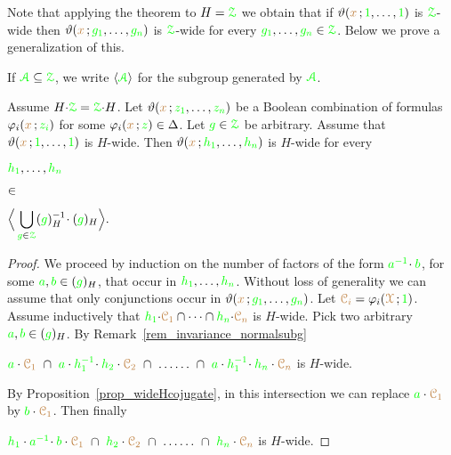 Note that applying the theorem to  $H={\color{green}\EuScript Z}$ we obtain that if $\vartheta({\color{brown} x}\,;{\color{green} 1},\dots,{\color{green} 1})$ is ${\color{green}\EuScript Z}$-wide then $\vartheta({\color{brown} x}\,;{\color{green} g_1},\dots,{\color{green} g_n})$ is ${\color{green}\EuScript Z}$-wide for every ${\color{green} g_1},\dots,{\color{green} g_n}\in{\color{green}\EuScript Z}$.
Below we prove a generalization of this. 

If ${\color{green}\EuScript A}\subseteq{\color{green}\EuScript Z}$, we write \emph{$\langle{\color{green}\EuScript A}\rangle$} for the subgroup generated by ${\color{green}\EuScript A}$.

\begin{proposition}\label{prop_stabilizer1}
  \def\medrel#1{\parbox[t]{5ex}{$\displaystyle\hfil #1$}}
  \def\ceq#1#2#3{\parbox[t]{15ex}{$\displaystyle #1$}\medrel{#2}{$\displaystyle #3$}}
  Assume $H{\cdot}{\color{green}\EuScript Z}={\color{green}\EuScript Z}{\cdot}H$.
   Let $\vartheta({\color{brown} x}\,;{\color{green} z_1},\dots,{\color{green} z_n})$ be a Boolean combination of formulas $\varphi_i({\color{brown} x}\,;{\color{green} z_i})$ for some $\varphi_i({\color{brown} x}\,;{\color{green} z})\in\Delta$.
  Let ${\color{green} g}\in{\color{green}\EuScript Z}$ be arbitrary.
  Assume that $\vartheta({\color{brown} x}\,;{\color{green} 1},\dots,{\color{green} 1})$ is $H$-wide.
  Then $\vartheta({\color{brown} x}\,;{\color{green} h_1},\dots,{\color{green} h_n})$ is $H$-wide for every 
  
  \ceq{\hfill{\gr h_1},\dots,{\gr h_n}}{\in}{\Big\<\bigcup_{{\gr g}\in\grZ}({\gr g})_H^{-1}\!\cdot({\gr g})_H\Big\>.}
\end{proposition}

\begin{proof}
  We proceed by induction on the number of factors of the form ${\color{green} a^{-1}}\!\cdot{\color{green}b}$, for some ${\color{green} a},{\color{green} b}\in({\color{green} g})_H$, that occur in ${\color{green} h_1},\dots,{\color{green} h_n}$.
  Without loss of generality we can assume that only conjunctions occur in $\vartheta({\color{brown} x}\,;{\color{green} g_1},\dots,{\color{green} g_n})$.
  Let ${\color{brown}\EuScript C_i}=\varphi_i({\color{brown}\EuScript X}\,;{\color{green} 1})$.
  Assume inductively that ${\color{green} h_1}{\cdot}{\color{brown}\EuScript C_1}\cap\dots\cap{\color{green}h_n}{\cdot}{\color{brown}\EuScript C_n}$ is $H$-wide.
  Pick two arbitrary ${\color{green} a},{\color{green} b}\in({\color{green} g})_H$.
  By Remark~\ref{rem_invariance_normalsubg} 
  
  \hspace*{7ex}${\gr a}\cdot{\mr\C_1}\ \cap\ {\gr a}\cdot{\gr h_1^{-1}}\!\cdot{\gr h_2}\cdot{\mr\C_2}\ \cap\ \dots\dots\ \cap\ {\gr a}\cdot{\gr h_1^{-1}}\!\cdot{\gr h_n}\cdot{\mr\C_n}$ is $H$-wide.
  
  By Proposition~\ref{prop_wideHcojugate}, in this intersection we can replace ${\color{green} a}\cdot{\color{brown}\EuScript C_1}$ by ${\color{green} b}\cdot{\color{brown}\EuScript C_1}$.
  Then finally 

  \hspace*{7ex}${\gr h_1}\cdot{\gr a^{-1}}\!\cdot{\gr b}\cdot{\mr\C_1}\ \cap\ {\gr h_2}\cdot{\mr\C_2}\ \cap\ \dots\dots\ \cap\ {\gr h_n}\cdot{\mr\C_n}$ is $H$-wide.
\end{proof}


